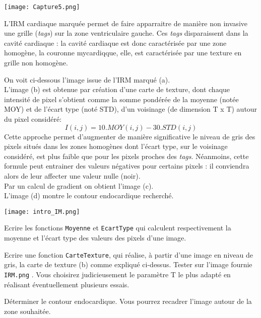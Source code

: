 \begin{marginfigure}
\texttt{[image: Capture5.png]}
\end{marginfigure}
L'IRM cardiaque marquée permet de faire apparraitre de manière non invasive une grille (\textit{tags}) sur la zone ventriculaire gauche. Ces \textit{tags} disparaissent dans la cavité cardiaque : la cavité cardiaque est donc caractérisée par une zone homogène, la couronne mycardiqque, elle, est caractérisée par une texture en grille non homogène.



On voit ci-dessous l'image issue de l'IRM marqué (a).\\
L'image (b) est obtenue par création d'une carte de texture, dont chaque intensité de pixel s'obtient comme la somme pondérée de la moyenne (notée MOY) et de l'écart type (noté STD), d'un voisinage (de dimension T x T) autour du pixel considéré:
\begin{equation}
I(i,j)=10.MOY(i,j)-30.STD(i,j)
\end {equation}
Cette approche permet d'augmenter de manière significative le niveau de gris des pixels situés dans les zones homogènes dont l'écart type, sur le voisinage considéré, est plus faible que pour les pixels proches des \textit{tags}. Néanmoins, cette formule peut entrainer des valeurs négatives pour certains pixels : il conviendra alors de leur affecter une valeur nulle (noir).\\

Par un calcul de gradient on obtient l'image (c).\\
L'image (d) montre le contour endocardique recherché.

\begin{minipage}{1\textwidth}%
\texttt{[image: intro\_IM.png]}
\end{minipage}

\begin{question}
Ecrire les fonctions \texttt{Moyenne} et \texttt{EcartType} qui calculent respectivement la moyenne et l'écart type des valeurs des pixels d'une image. 
\end{question}

\begin{question}
Ecrire une fonction \texttt{CarteTexture}, qui réalise, à partir d'une image en niveau de gris, la carte de texture (b) comme expliqué ci-dessus. Tester sur l'image fournie \texttt{IRM.png} . Vous choisirez judicieusement le paramètre T le plus adapté en réalisant éventuellement plusieurs essais.   
\end{question}

\begin{question}
Déterminer le contour endocardique. Vous pourrez recadrer l'image autour de la zone souhaitée.
\end{question}





